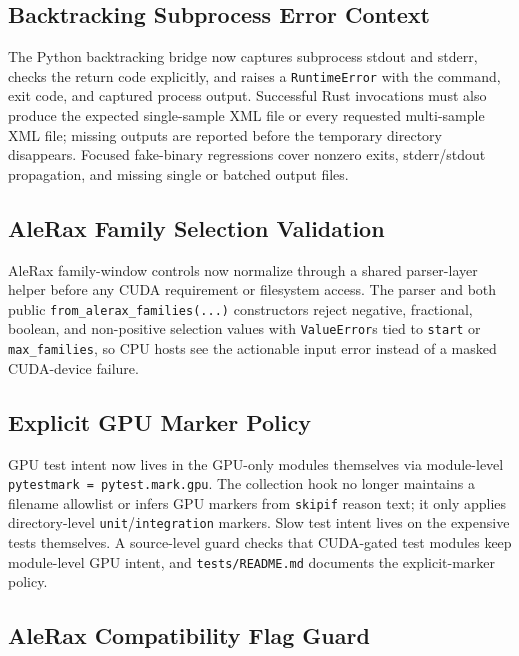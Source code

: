 \documentclass[11pt]{article}
\begin{document}
\subsection{Backtracking Subprocess Error Context}

The Python backtracking bridge now captures subprocess stdout and stderr,
checks the return code explicitly, and raises a \texttt{RuntimeError} with the
command, exit code, and captured process output.  Successful Rust invocations
must also produce the expected single-sample XML file or every requested
multi-sample XML file; missing outputs are reported before the temporary
directory disappears.  Focused fake-binary regressions cover nonzero exits,
stderr/stdout propagation, and missing single or batched output files.

\subsection{AleRax Family Selection Validation}

AleRax family-window controls now normalize through a shared parser-layer
helper before any CUDA requirement or filesystem access.  The parser and both
public \texttt{from\_alerax\_families(...)} constructors reject negative,
fractional, boolean, and non-positive selection values with
\texttt{ValueError}s tied to \texttt{start} or \texttt{max\_families}, so CPU
hosts see the actionable input error instead of a masked CUDA-device failure.

\subsection{Explicit GPU Marker Policy}

GPU test intent now lives in the GPU-only modules themselves via module-level
\texttt{pytestmark = pytest.mark.gpu}.  The collection hook no longer maintains
a filename allowlist or infers GPU markers from \texttt{skipif} reason text; it
only applies directory-level \texttt{unit}/\texttt{integration} markers.  Slow
test intent lives on the expensive tests themselves.  A source-level guard
checks that CUDA-gated test modules keep module-level GPU intent, and
\texttt{tests/README.md} documents the explicit-marker policy.

\subsection{AleRax Compatibility Flag Guard}
\end{document}
